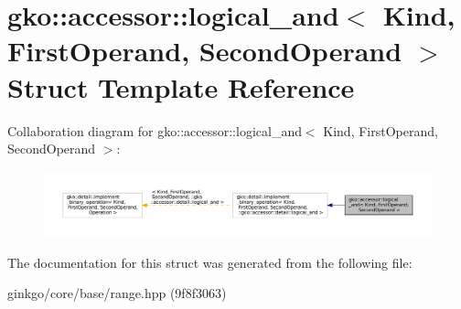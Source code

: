 \hypertarget{structgko_1_1accessor_1_1logical__and}{}\section{gko\+:\+:accessor\+:\+:logical\+\_\+and$<$ Kind, First\+Operand, Second\+Operand $>$ Struct Template Reference}
\label{structgko_1_1accessor_1_1logical__and}


Collaboration diagram for gko\+:\+:accessor\+:\+:logical\+\_\+and$<$ Kind, First\+Operand, Second\+Operand $>$\+:
\nopagebreak
\begin{figure}[H]
\begin{center}
\leavevmode
\includegraphics[width=350pt]{structgko_1_1accessor_1_1logical__and__coll__graph}
\end{center}
\end{figure}


The documentation for this struct was generated from the following file\+:\begin{DoxyCompactItemize}
\item 
ginkgo/core/base/range.\+hpp (9f8f3063)\end{DoxyCompactItemize}

